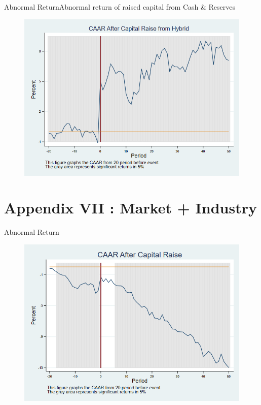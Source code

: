 \documentclass{beamer}
\begin{document}
	
	\begin{frame}{Abnormal Return}{Abnormal return of raised capital from Cash \& Reserves}
		\label{car_marketHybrid}
		\begin{figure}
			\centering
			\includegraphics[width=0.65\linewidth]{Output/car_marketHybrid}
			\label{fig:car_marketHybrid}
		\end{figure}
	\end{frame}
	
	\section{Appendix VII : Market + Industry}
	
	\begin{frame}{Abnormal Return}
		\label{car_marketindustry}
		\begin{figure}
			\centering
			\includegraphics[width=0.7\linewidth]{Output/car_marketindustry.png}
			\label{fig:car_marketindustry}
		\end{figure}
	\end{frame}
	
\end{document}
